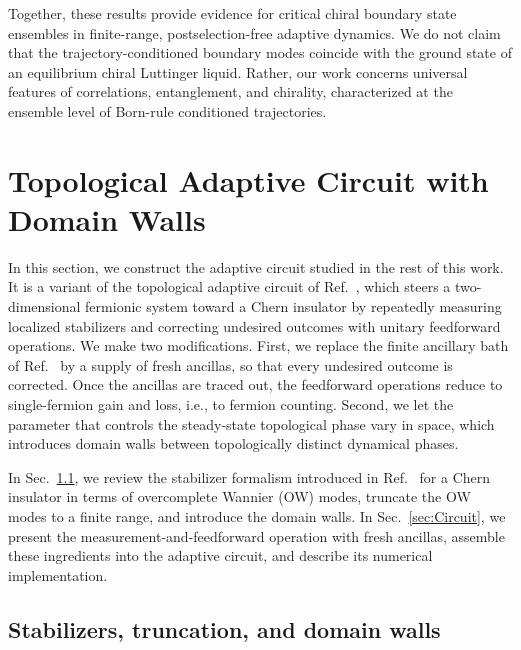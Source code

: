 \documentclass[aps,prb,10pt,twocolumn,superscriptaddress,longbibliography,floatfix]{revtex4-2}
\newcommand{\claudeadd}[1]{{\color{orange}#1}}
\begin{document}
Together, these results provide evidence for critical chiral boundary state ensembles in finite-range, postselection-free adaptive dynamics. We do not claim that the trajectory-conditioned boundary modes coincide with the ground state of an equilibrium chiral Luttinger liquid. Rather, our work concerns universal features of correlations, entanglement, and chirality, characterized at the ensemble level of Born-rule conditioned trajectories.

\section{Topological Adaptive Circuit with Domain Walls}
\label{sec:Model}

In this section, we construct the adaptive circuit studied in the rest of this work. It is a variant of the topological adaptive circuit of Ref.~\cite{BhuiyanPanJian2026}, which steers a two-dimensional fermionic system toward a Chern insulator by repeatedly measuring localized stabilizers and correcting undesired outcomes with unitary feedforward operations. We make two modifications. First, we replace the finite ancillary bath of Ref.~\cite{BhuiyanPanJian2026} by a supply of fresh ancillas, so that every undesired outcome is corrected. Once the ancillas are traced out, the feedforward operations reduce to single-fermion gain and loss, i.e., to fermion counting. Second, we let the parameter \claudeadd{that} controls the steady-state topological phase vary in space, which introduces domain walls between topologically distinct dynamical phases.

In Sec.~\ref{sec:Stabilizers}, we review the stabilizer formalism introduced in Ref.~\cite{BhuiyanPanJian2026} for a Chern insulator in terms of overcomplete Wannier (OW) modes, truncate the OW modes to a finite range, and introduce the domain walls. In Sec.~\ref{sec:Circuit}, we present the measurement-and-feedforward operation with fresh ancillas, assemble these ingredients into the adaptive circuit, and describe its numerical implementation.


\subsection{Stabilizers, truncation, and domain walls}
\label{sec:Stabilizers}
\end{document}
